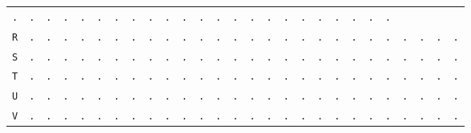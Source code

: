 \begin{figure}[H]
\begin{center}
{\begin{tabular}{c|cccccccccccccccccccccccccc}
				\texttt{.} & \texttt{.} & \texttt{.} & \texttt{.} &
				\texttt{.} & \texttt{.} & \texttt{.} & \texttt{.} &
				\texttt{.} & \texttt{.} & \texttt{.} & \texttt{.} &
				\texttt{.} & \texttt{.} & \texttt{.} & \texttt{.} &
				\texttt{.} & \texttt{.} & \texttt{.} & \texttt{.} &
				\texttt{.} & \texttt{.} & \texttt{.}                             \\
				\texttt{R} & \texttt{.} & \texttt{.} & \texttt{.} &
				\texttt{.} & \texttt{.} & \texttt{.} & \texttt{.} &
				\texttt{.} & \texttt{.} & \texttt{.} & \texttt{.} &
				\texttt{.} & \texttt{.} & \texttt{.} & \texttt{.} &
				\texttt{.} & \texttt{.} & \texttt{.} & \texttt{.} &
				\texttt{.} & \texttt{.} & \texttt{.} & \texttt{.} &
				\texttt{.} & \texttt{.} & \texttt{.}                             \\
				\texttt{S} & \texttt{.} & \texttt{.} & \texttt{.} &
				\texttt{.} & \texttt{.} & \texttt{.} & \texttt{.} &
				\texttt{.} & \texttt{.} & \texttt{.} & \texttt{.} &
				\texttt{.} & \texttt{.} & \texttt{.} & \texttt{.} &
				\texttt{.} & \texttt{.} & \texttt{.} & \texttt{.} &
				\texttt{.} & \texttt{.} & \texttt{.} & \texttt{.} &
				\texttt{.} & \texttt{.} & \texttt{.}                             \\
				\texttt{T} & \texttt{.} & \texttt{.} & \texttt{.} &
				\texttt{.} & \texttt{.} & \texttt{.} & \texttt{.} &
				\texttt{.} & \texttt{.} & \texttt{.} & \texttt{.} &
				\texttt{.} & \texttt{.} & \texttt{.} & \texttt{.} &
				\texttt{.} & \texttt{.} & \texttt{.} & \texttt{.} &
				\texttt{.} & \texttt{.} & \texttt{.} & \texttt{.} &
				\texttt{.} & \texttt{.} & \texttt{.}                             \\
				\texttt{U} & \texttt{.} & \texttt{.} & \texttt{.} &
				\texttt{.} & \texttt{.} & \texttt{.} & \texttt{.} &
				\texttt{.} & \texttt{.} & \texttt{.} & \texttt{.} &
				\texttt{.} & \texttt{.} & \texttt{.} & \texttt{.} &
				\texttt{.} & \texttt{.} & \texttt{.} & \texttt{.} &
				\texttt{.} & \texttt{.} & \texttt{.} & \texttt{.} &
				\texttt{.} & \texttt{.} & \texttt{.}                             \\
				\texttt{V} & \texttt{.} & \texttt{.} & \texttt{.} &
				\texttt{.} & \texttt{.} & \texttt{.} & \texttt{.} &
				\texttt{.} & \texttt{.} & \texttt{.} & \texttt{.} &
				\texttt{.} & \texttt{.} & \texttt{.} & \texttt{.} &
				\texttt{.} & \texttt{.} & \texttt{.} & \texttt{.} &
				\texttt{.} & \texttt{.} & \texttt{.} & \texttt{.} &
				\texttt{.} & \texttt{.} & \texttt{.}                             \\

\end{tabular}}
\end{center}
\end{figure}
